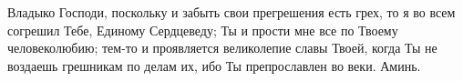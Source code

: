 {\centering{}

}

\begin{mymulticols}

Владыко Господи, поскольку и забыть свои прегрешения есть грех, то я во всем согрешил Тебе, Единому Сердцеведу; Ты и прости мне все по Твоему человеколюбию; тем-то и проявляется великолепие славы Твоей, когда Ты не воздаешь грешникам по делам их, ибо Ты препрославлен во веки. Аминь. 

\end{mymulticols}

\mychapterending
